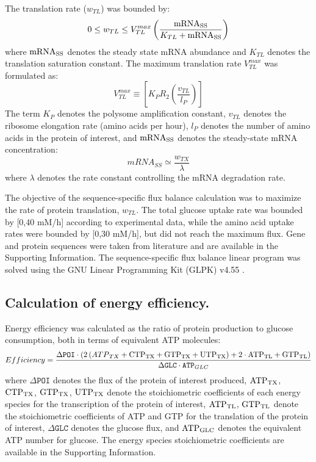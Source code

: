 \documentclass[journal=asbcd6,manuscript=article]{achemso}
\begin{document}
The translation rate ($w_{TL}$) was bounded by:
 \begin{equation}
	0\leq w_{TL} \leq V_{TL}^{max}\left(\frac{\rm mRNA_{SS}}{K_{TL}+\rm mRNA_{SS}}\right)
\end{equation}
where $\rm mRNA_{SS}$ denotes the steady state mRNA abundance and $K_{TL}$ denotes the translation saturation constant.
The maximum translation rate $V_{TL}^{max}$ was formulated as:
\begin{equation}
	V_{TL}^{max} \equiv \left[K_{P} R_{2}\left(\frac{v_{TL}}{l_{P}}\right)\right]
\end{equation}
The term $K_{P}$ denotes the polysome amplification constant,
$v_{TL}$ denotes the ribosome elongation rate (amino acids per hour),
$l_{P}$ denotes the number of amino acids in the protein of interest,
and $\rm mRNA_{SS}$ denotes the steady-state mRNA concentration:
\begin{equation}
	 mRNA_{SS}\simeq\frac{w_{TX}}{\lambda}
\end{equation}
where $\lambda$ denotes the rate constant controlling the mRNA degradation rate.

The objective of the sequence-specific flux balance calculation was to maximize the rate of protein translation, $w_{TL}$.
The total glucose uptake rate was bounded by [0,40 mM/h] according to experimental data, while the amino acid uptake rates were bounded by [0,30 mM/h], but did not reach the maximum flux.
Gene and protein sequences were taken from literature and are available in the Supporting Information.
The sequence-specific flux balance linear program was solved using the GNU Linear Programming Kit (GLPK) v4.55 \cite{GLPK}.

\subsection*{Calculation of energy efficiency.}
Energy efficiency was calculated as the ratio of protein production to glucose consumption, both in terms of equivalent ATP molecules:
\begin{equation}\label{eqn:energy-efficiency-definition}
	Efficiency=\frac{\Delta\texttt{POI}\cdot \left(2\left({ATP}_{TX}+\rm {CTP}_{TX}+\rm {GTP}_{TX}+\rm {UTP}_{TX}\right)+\rm2\cdot\rm {ATP}_{TL}+\rm {GTP}_{TL}\right)}{\Delta\texttt{GLC}\cdot\texttt{ATP}_{GLC}}
\end{equation}
where $\Delta\texttt{POI}$ denotes the flux of the protein of interest produced, $\rm {ATP}_{TX}$, $\rm {CTP}_{TX}$, $\rm {GTP}_{TX}$, $\rm {UTP}_{TX}$ denote the stoichiometric coefficients of each energy species for the transcription of the protein of interest, $\rm {ATP}_{TL}$, $\rm {GTP}_{TL}$ denote the stoichiometric coefficients of ATP and GTP for the translation of the protein of interest, $\Delta\texttt{GLC}$ denotes the glucose flux, and $\rm {ATP}_{GLC}$ denotes the equivalent ATP number for glucose.
The energy species stoichiometric coefficients are available in the Supporting Information.
\end{document}
